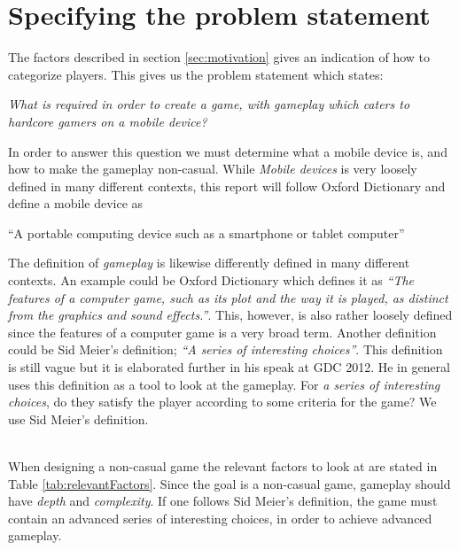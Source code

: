 \section{Specifying the problem statement}
\label{sec:specifyingtheproblemstatemen}

The factors described in section \ref{sec:motivation} gives an indication of how to categorize players.
This gives us the problem statement which states:
\begin{center}
\textit{What is required in order to create a game, with gameplay which caters to hardcore gamers on a mobile device?}
\end{center}

In order to answer this question we must determine what a mobile device is, and how to make the gameplay non-casual.
While \textit{Mobile devices} is very loosely defined in many different contexts, this report will follow Oxford Dictionary and define a mobile device as 
\begin{center}
``A portable computing device such as a smartphone or tablet computer''\cite{mobileOx}
\end{center}

The definition of \textit{gameplay} is likewise differently defined in many different contexts. 
An example could be Oxford Dictionary which defines it as \textit{``The features of a computer game, such as its plot and the way it is played, as distinct from the graphics and sound effects.''}\cite{gameplayOx}. This, however, is also rather loosely defined since the features of a computer game is a very broad term. 
Another definition could be Sid Meier's definition; \textit{``A series of interesting choices''}\cite{GDC2012}. 
This definition is still vague but it is elaborated further in his speak at GDC 2012.\cite{GDC2012}
He in general uses this definition as a tool to look at the gameplay. For \textit{a series of interesting choices}, do they satisfy the player according to some criteria for the game? We use Sid Meier's definition.\\\\

When designing a non-casual game the relevant factors to look at are stated in Table \ref{tab:relevantFactors}.
Since the goal is a non-casual game, gameplay should have \textit{depth} and \textit{complexity}.
If one follows Sid Meier's definition, the game must contain an advanced series of interesting choices, in order to achieve advanced gameplay.

